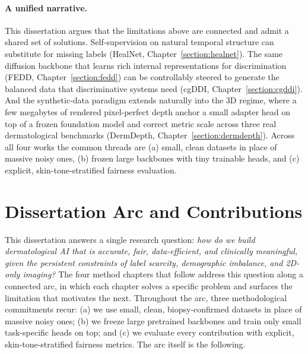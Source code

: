 \documentclass[11pt]{ucthesis}
\begin{document}
\paragraph{A unified narrative.}
This dissertation argues that the limitations above are connected and admit a shared set of solutions. Self-supervision on natural temporal structure can substitute for missing labels (HealNet, Chapter~\ref{section:healnet}). The same diffusion backbone that learns rich internal representations for discrimination (FEDD, Chapter~\ref{section:fedd}) can be controllably steered to generate the balanced data that discriminative systems need (cgDDI, Chapter~\ref{section:cgddi}). And the synthetic-data paradigm extends naturally into the 3D regime, where a few megabytes of rendered pixel-perfect depth anchor a small adapter head on top of a frozen foundation model and correct metric scale across three real dermatological benchmarks (DermDepth, Chapter~\ref{section:dermdepth}). Across all four works the common threads are (a) small, clean datasets in place of massive noisy ones, (b) frozen large backbones with tiny trainable heads, and (c) explicit, skin-tone-stratified fairness evaluation.

\section{Dissertation Arc and Contributions}

This dissertation answers a single research question: \emph{how do we build dermatological AI that is accurate, fair, data-efficient, and clinically meaningful, given the persistent constraints of label scarcity, demographic imbalance, and 2D-only imaging?} The four method chapters that follow address this question along a connected arc, in which each chapter solves a specific problem and surfaces the limitation that motivates the next. Throughout the arc, three methodological commitments recur: (a) we use small, clean, biopsy-confirmed datasets in place of massive noisy ones; (b) we freeze large pretrained backbones and train only small task-specific heads on top; and (c) we evaluate every contribution with explicit, skin-tone-stratified fairness metrics. The arc itself is the following.
\end{document}
